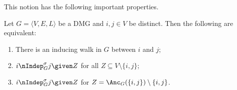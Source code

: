 This notion has the following important properties.
\begin{Prp}\label{prp:inducing_path_properties}
  Let $G = \langle V,E,L \rangle$ be a DMG and $i,j \in V$ be distinct. Then the following are equivalent:
  \begin{enumerate}[label=(\roman*)]
    \item There is an inducing walk in $G$ between $i$ and $j$;
    \item $i \nIndep^\sigma_G j \given Z$ for all $Z \subseteq V \setminus \{i,j\}$;
    \item $i \nIndep^\sigma_G j \given Z$ for $Z = \Anc_G(\{i,j\}) \setminus \{i,j\}$.
  \end{enumerate}
\end{Prp}
